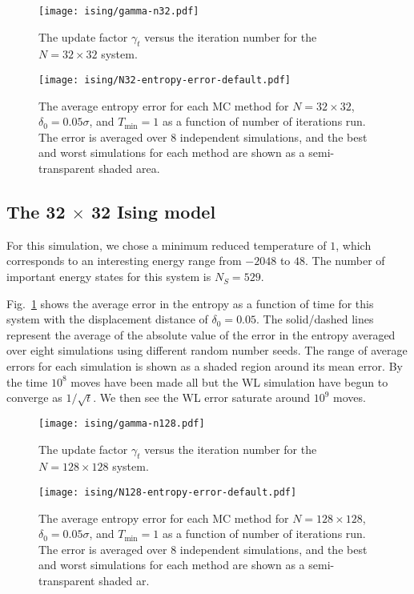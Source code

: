 \documentclass[letterpaper,twocolumn,amsmath,amssymb,pre,aps,10pt]{revtex4-1}
\begin{document}
\begin{figure}
\texttt{[image: ising/gamma-n32.pdf]}
  \caption{
  The update factor $\gamma_t$ versus the iteration number for the $N=32 \times 32$
  system.}
\end{figure}

\begin{figure}
\texttt{[image: ising/N32-entropy-error-default.pdf]}
  \caption{
  The average entropy error for each MC method for $N=32 \times 32$,
               $\delta_0 = 0.05\sigma$, and $T_{\min} = 1$
               as a function of number of iterations run.  The error is
               averaged over 8 independent simulations, and the best
               and worst simulations for each method are shown as a
               semi-transparent shaded area.}\label{fig:n32}
\end{figure}

\subsection{The 32 $\times$ 32 Ising model}
For this simulation, we chose a minimum reduced temperature of $1$, which
corresponds to an interesting energy range from $-2048$ to $48$.  The number of
important energy states for this system is $N_S = 529$.

Fig.~\ref{fig:n32} shows the average error in the entropy as a function of time for
this system with the displacement distance of $\delta_0 = 0.05$. The solid/dashed lines
represent the average of the absolute value of the error in the entropy averaged
over eight simulations using different random number seeds. The range of average
errors for each simulation is shown as a shaded region around its mean error. By
the time $10^8$ moves have been made all but the WL simulation have begun to
converge as $1/\sqrt{t}$. We then see the WL error saturate around $10^9$ moves.

\begin{figure}
\texttt{[image: ising/gamma-n128.pdf]}
  \caption{
  The update factor $\gamma_t$ versus the iteration number for the $N=128 \times 128$
  system.}
\end{figure}

\begin{figure}
\texttt{[image: ising/N128-entropy-error-default.pdf]}
  \caption{
  The average entropy error for each MC method for $N=128 \times 128$,
               $\delta_0 = 0.05\sigma$, and $T_{\min} = 1$
               as a function of number of iterations run.  The error is
               averaged over 8 independent simulations, and the best
               and worst simulations for each method are shown as a
               semi-transparent shaded ar.}\label{fig:n128}
\end{figure}
\end{document}
